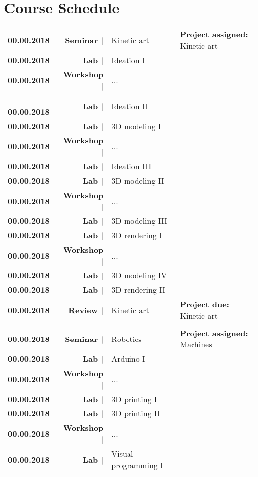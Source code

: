 \documentclass[11pt,article,oneside]{memoir}
\begin{document}
\section{Course Schedule}

\begin{table}[H]
\small
\begin{tabular}{l r @{\hskip 0.1cm} l @{\hskip 0.5cm} l}
\textbf{00.00.2018} & \textbf{Seminar |} & Kinetic art & \textbf{Project assigned:} Kinetic art\\
\textbf{00.00.2018} & \textbf{Lab |} & Ideation I\\
\textbf{00.00.2018} & \textbf{Workshop |} & ...\\\
\textbf{00.00.2018} & \textbf{Lab |} & Ideation II\\
\textbf{00.00.2018} & \textbf{Lab |} & 3D modeling I\\
\textbf{00.00.2018} & \textbf{Workshop |} & ...\\
\textbf{00.00.2018} & \textbf{Lab |} & Ideation III\\
\textbf{00.00.2018} & \textbf{Lab |} & 3D modeling II\\
\textbf{00.00.2018} & \textbf{Workshop |} & ...\\
\textbf{00.00.2018} & \textbf{Lab |} & 3D modeling III\\
\textbf{00.00.2018} & \textbf{Lab |} & 3D rendering I\\
\textbf{00.00.2018} & \textbf{Workshop |} & ...\\
\textbf{00.00.2018} & \textbf{Lab |} & 3D modeling IV\\
\textbf{00.00.2018} & \textbf{Lab |} & 3D rendering II\\
\textbf{00.00.2018} & \textbf{Review |} & Kinetic art & \textbf{Project due:} Kinetic art\\
\\
\textbf{00.00.2018} & \textbf{Seminar |} & Robotics & \textbf{Project assigned:} Machines\\
\textbf{00.00.2018} & \textbf{Lab |} & Arduino I\\
\textbf{00.00.2018} & \textbf{Workshop |} & ... \\
\textbf{00.00.2018} & \textbf{Lab |} & 3D printing I \\
\textbf{00.00.2018} & \textbf{Lab |} & 3D printing II\\
\textbf{00.00.2018} & \textbf{Workshop |} & ...\\
\textbf{00.00.2018} & \textbf{Lab |} & Visual programming I\\ %

\end{tabular}
\end{table}
\end{document}
